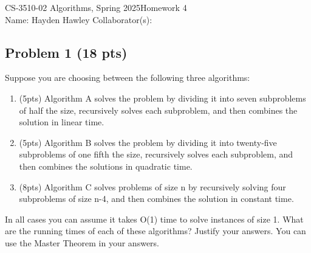 \documentclass[12pt]{article}
\begin{document}
\noindent CS-3510-02 Algorithms, Spring 2025\hfill Homework 4\\
Name: Hayden Hawley \hfill Collaborator(s):

\hrulefill

\subsection*{Problem 1 (18 pts)}
Suppose you are choosing between the following three algorithms:
\begin{enumerate}[label=(\alph*)]
    \item (5pts) Algorithm A solves the problem by dividing it into seven subproblems of half the size, recursively solves each subproblem, and then combines the solution in linear time. 
    \item (5pts) Algorithm B solves the problem by dividing it into twenty-five subproblems of one fifth the size, recursively solves each subproblem, and then combines the solutions in quadratic time.
    \item (8pts) Algorithm C solves problems of size n by recursively solving four subproblems of size n-4, and then combines the solution in constant time.
\end{enumerate}
In all cases you can assume it takes O(1) time to solve instances of size 1. What are the running times of each of these algorithms? Justify your answers. You can use the Master Theorem in your answers.
\end{document}
